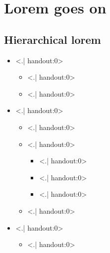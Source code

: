   \section{Lorem goes on}

  \subsection{Hierarchical lorem}

  \begin{frame}{\framesectiontitle}{\framesectionsubtitle}
    \begin{itemize}[<+->] \footnotesize
      \item \alert<.| handout:0>{\lipsumgetsentence[12]}
      \begin{itemize}[<+->] \footnotesize
        \item \alert<.| handout:0>{\lipsumgetsentence[13]}
        \item \alert<.| handout:0>{\lipsumgetsentence[14]}
      \end{itemize}
      \item \alert<.| handout:0>{\lipsumgetsentence[15]}
      \begin{itemize}[<+->] \footnotesize
        \item \alert<.| handout:0>{\lipsumgetsentence[16]}
        \item \alert<.| handout:0>{\lipsumgetsentence[17]}
          \begin{itemize}[<+->] \footnotesize
            \item \alert<.| handout:0>{\lipsumgetsentence[18]}
            \item \alert<.| handout:0>{\lipsumgetsentence[19]}
            \item \alert<.| handout:0>{\lipsumgetsentence[20]}
          \end{itemize}
        \item \alert<.| handout:0>{\lipsumgetsentence[21]}
      \end{itemize}
      \item \alert<.| handout:0>{\lipsumgetsentence[22]}
      \begin{itemize}[<+->] \footnotesize
        \item \alert<.| handout:0>{\lipsumgetsentence[23]}
      \end{itemize}
    \end{itemize}
  \end{frame}

